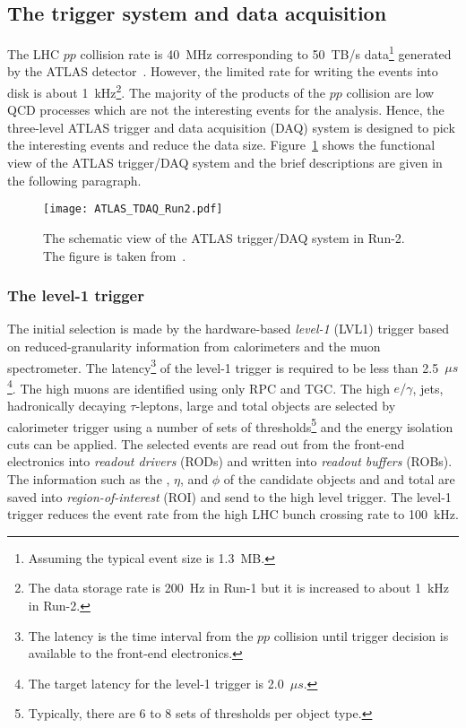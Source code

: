 
\subsection{The trigger system and data acquisition}
\label{subsec:ae_trigger}
The LHC $pp$ collision rate is 40~MHz corresponding to 50~TB/s data\footnote{Assuming the typical event size is 1.3~MB.} generated by the ATLAS detector~\cite{Kordas:2007zz}.
However, the limited rate for writing the events into disk is about 1~kHz\footnote{The data storage rate is 200~Hz in Run-1 but it is increased to about 1~kHz in Run-2.}.
The majority of the products of the $pp$ collision are low \pt QCD processes which are not the interesting events for the analysis.  
Hence, the three-level ATLAS trigger and data acquisition (DAQ) system is designed to pick the interesting events and reduce the data size.
Figure~\ref{fig:ae_tdaq} shows the functional view of the ATLAS trigger/DAQ system and the brief descriptions are given in the following paragraph.

\begin{figure}[htbp]
    \begin{center}
        \texttt{[image: ATLAS\_TDAQ\_Run2.pdf]}
        \caption{The schematic view of the ATLAS trigger/DAQ system in Run-2.
        The figure is taken from~\cite{Martinez:2016udm}.}
        \label{fig:ae_tdaq}
    \end{center}
\end{figure}


\subsubsection{The level-1 trigger}
\label{subsubsec:ae_LVL1}
The initial selection is made by the hardware-based \textit{level-1} (LVL1) trigger based on reduced-granularity information from calorimeters and the muon spectrometer.
The latency\footnote{The latency is the time interval from the $pp$ collision until trigger decision is available to the front-end electronics.} of the level-1 trigger is required to be less than 2.5~$\mu s$\footnote{The target latency for the level-1 trigger is 2.0~$\mu s$.}.
The high \pt muons are identified using only RPC and TGC.
The high \pt $e/\gamma$, jets, hadronically decaying $\tau$-leptons, large \met and total \et objects are selected by calorimeter trigger using a number of sets of \pt thresholds\footnote{Typically, there are 6 to 8 sets of thresholds per object type.} and the energy isolation cuts can be applied. 
The selected events are read out from the front-end electronics into \textit{readout drivers} (RODs) and written into \textit{readout buffers} (ROBs).
The information such as the \pt, $\eta$, and $\phi$ of the candidate objects and \met and total \et are saved into \textit{region-of-interest} (ROI) and send to the high level trigger.
The level-1 trigger reduces the event rate from the high LHC bunch crossing rate to 100~kHz.

